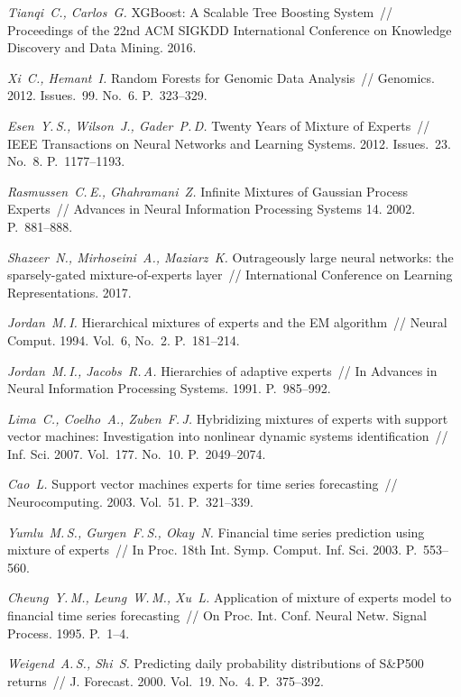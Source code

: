 \documentclass[12pt, twoside]{article}
\numberwithin{equation}{section}
\newcommand*{\No}{No.}
\begin{document}
\begin{thebibliography}{99}
	\textit{Tianqi~C., Carlos~G.} XGBoost: A Scalable Tree Boosting System~// Proceedings of the 22nd ACM SIGKDD International Conference on Knowledge Discovery and Data Mining. 2016.
	
	\textit{Xi~C., Hemant~I.} Random Forests for Genomic Data Analysis~// Genomics. 2012. Issues.~99. \No~6. P.~323--329.

	\textit{Esen~Y.\,S., Wilson~J., Gader~P.\,D.} Twenty Years of Mixture of Experts~// IEEE Transactions on Neural Networks and Learning Systems. 2012. Issues.~23. \No~8. P.~1177--1193.

	\textit{Rasmussen~C.\,E., Ghahramani~Z.} Infinite Mixtures of Gaussian Process Experts~// Advances in Neural Information Processing Systems 14. 2002. P.~881--888.

	\textit{Shazeer~N., Mirhoseini~A., Maziarz~K.} Outrageously large neural networks: the sparsely-gated mixture-of-experts layer~//  International Conference on Learning Representations. 2017.
	
	\textit{Jordan~M.\,I.} Hierarchical mixtures of experts and the EM algorithm~// Neural Comput. 1994. Vol.~6, \No~2. P.~181--214.
	
	\textit{Jordan~M.\,I., Jacobs~R.\,A.} Hierarchies of adaptive experts~// In Advances in Neural Information Processing Systems. 1991. P.~985--992.
	
	\textit{Lima~C., Coelho~A., Zuben~F.\,J.} Hybridizing mixtures of experts with support vector machines: Investigation into nonlinear dynamic systems identification~// Inf. Sci. 2007. Vol.~177. \No~10. P.~2049--2074.

	\textit{Cao~L.} Support vector machines experts for time series forecasting~// Neurocomputing. 2003. Vol.~51. P.~321--339.
	
	\textit{Yumlu~M.\,S., Gurgen~F.\,S.,  Okay~N.} Financial time series prediction using mixture of experts~// In Proc. 18th Int. Symp. Comput. Inf. Sci. 2003. P.~553--560.
	
	\textit{Cheung~Y.\,M., Leung~W.\,M., Xu~L.} Application of mixture of experts model to financial time series forecasting~// On Proc. Int. Conf. Neural Netw. Signal Process. 1995. P.~1--4.
	
	\textit{Weigend~A.\,S., Shi~S.} Predicting daily probability distributions of S\&P500 returns~// J. Forecast. 2000. Vol.~19. \No~4. P.~375--392.
	

\end{thebibliography}
\end{document}
